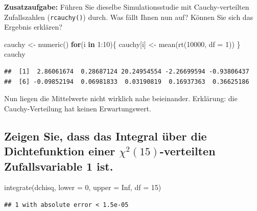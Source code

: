 \documentclass[12pt,a4paper]{article}
\newenvironment{Shaded}{\begin{snugshade}}{\end{snugshade}}
\newcommand{\AttributeTok}[1]{\textcolor[rgb]{0.77,0.63,0.00}{#1}}
\newcommand{\ConstantTok}[1]{\textcolor[rgb]{0.00,0.00,0.00}{#1}}
\newcommand{\ControlFlowTok}[1]{\textcolor[rgb]{0.13,0.29,0.53}{\textbf{#1}}}
\newcommand{\DecValTok}[1]{\textcolor[rgb]{0.00,0.00,0.81}{#1}}
\newcommand{\FunctionTok}[1]{\textcolor[rgb]{0.00,0.00,0.00}{#1}}
\newcommand{\NormalTok}[1]{#1}
\newcommand{\OtherTok}[1]{\textcolor[rgb]{0.56,0.35,0.01}{#1}}
\newcommand{\SpecialCharTok}[1]{\textcolor[rgb]{0.00,0.00,0.00}{#1}}
\begin{document}
\textbf{Zusatzaufgabe:} Führen Sie dieselbe Simulationsstudie mit
Cauchy-verteilten Zufallszahlen (\texttt{rcauchy()}) durch. Was fällt
Ihnen nun auf? Können Sie sich das Ergebnis erklären?

\begin{Shaded}
\begin{Highlighting}[]
\NormalTok{    cauchy }\OtherTok{\textless{}{-}} \FunctionTok{numeric}\NormalTok{()}
    \ControlFlowTok{for}\NormalTok{(i }\ControlFlowTok{in} \DecValTok{1}\SpecialCharTok{:}\DecValTok{10}\NormalTok{)\{}
\NormalTok{      cauchy[i] }\OtherTok{\textless{}{-}} \FunctionTok{mean}\NormalTok{(}\FunctionTok{rt}\NormalTok{(}\DecValTok{10000}\NormalTok{, }\AttributeTok{df =} \DecValTok{1}\NormalTok{))}
\NormalTok{    \}}
\NormalTok{    cauchy}
\end{Highlighting}
\end{Shaded}

\begin{verbatim}
##  [1]  2.86061674  0.28687124 20.24954554 -2.26699594 -0.93806437
##  [6] -0.09852194  0.06981833  0.03190819  0.16937363  0.36625186
\end{verbatim}

Nun liegen die Mittelwerte nicht wirklich nahe beieinander. Erklärung:
die Cauchy-Verteilung hat keinen Erwartungswert.

\hypertarget{zeigen-sie-dass-das-integral-uxfcber-die-dichtefunktion-einer-chi215-verteilten-zufallsvariable-1-ist.}{%
\subsection{\texorpdfstring{Zeigen Sie, dass das Integral über die
Dichtefunktion einer \(\chi^2(15)\)-verteilten Zufallsvariable 1
ist.}{Zeigen Sie, dass das Integral über die Dichtefunktion einer \textbackslash chi\^{}2(15)-verteilten Zufallsvariable 1 ist.}}\label{zeigen-sie-dass-das-integral-uxfcber-die-dichtefunktion-einer-chi215-verteilten-zufallsvariable-1-ist.}}

\begin{Shaded}
\begin{Highlighting}[]
    \FunctionTok{integrate}\NormalTok{(dchisq, }\AttributeTok{lower =} \DecValTok{0}\NormalTok{, }\AttributeTok{upper =} \ConstantTok{Inf}\NormalTok{, }\AttributeTok{df =} \DecValTok{15}\NormalTok{)}
\end{Highlighting}
\end{Shaded}

\begin{verbatim}
## 1 with absolute error < 1.5e-05
\end{verbatim}
\end{document}
